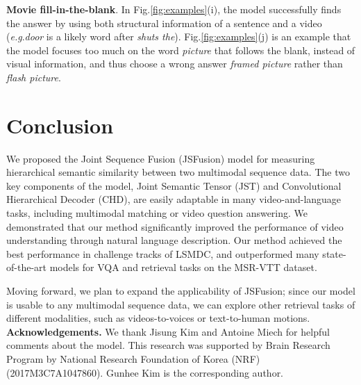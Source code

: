 \documentclass[runningheads]{llncs}
\makeatletter
\DeclareRobustCommand\onedot{\futurelet\@let@token\@onedot}
\def\onedot{.\@\xspace}
\def\eg{\textit{e.g}\onedot} \def\Eg{\textit{E.g}\onedot}
\makeatother
\begin{document}
\textbf{Movie fill-in-the-blank}.
In Fig.\ref{fig:examples}(i), the model successfully finds the answer by using both structural information of a sentence and a video (\eg \textit{door} is a likely word after \textit{shuts the}).
Fig.\ref{fig:examples}(j) is an example that the model focuses too much on the word \textit{picture} that follows the blank, instead of visual information, and  thus choose a wrong answer \textit{framed picture} rather than \textit{flash picture}.

\begin{comment}
Figure.\ref{fig:attention} illustrates visualization of attention map on Joint Semantic Tensor and subsequent layers of Convolutional Hierarchical Decoder.
We observe our model locate valid video-language joint region in attention map. 
\end{comment}


\section{Conclusion}
\label{sec:conclusion}

We proposed the Joint Sequence Fusion (JSFusion) model for measuring hierarchical semantic similarity between two multimodal sequence data.
The two key components of the model, Joint Semantic Tensor (JST) and Convolutional Hierarchical Decoder (CHD), are easily adaptable in many video-and-language tasks, including multimodal matching or video question answering. 
We demonstrated that our method significantly improved the performance of video understanding through natural language description.
Our method achieved the best performance in challenge tracks of LSMDC, 
and outperformed many state-of-the-art models for VQA and retrieval tasks on the MSR-VTT dataset. 

Moving forward, we plan to expand the applicability of JSFusion;
since our model is usable to any multimodal sequence data, we can explore other retrieval tasks of different modalities, such as videos-to-voices or text-to-human motions.
\\

\textbf{Acknowledgements.} We thank Jisung Kim and Antoine Miech for helpful comments about the model. This research was supported by Brain Research Program by National Research Foundation of Korea (NRF) (2017M3C7A1047860).  Gunhee Kim is the corresponding author. 

\clearpage



\end{document}
